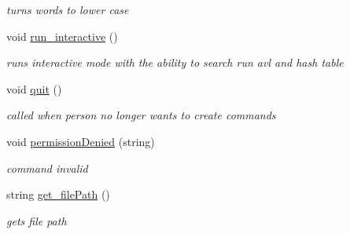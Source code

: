 \begin{DoxyCompactItemize}
\begin{DoxyCompactList}\small\item\em turns words to lower case \end{DoxyCompactList}\item 
void \hyperlink{class_interface_a48828fb2f7d1ce9cc3fe8f8bcf1a87b7}{run\+\_\+interactive} ()
\begin{DoxyCompactList}\small\item\em runs interactive mode with the ability to search run avl and hash table \end{DoxyCompactList}\item 
void \hyperlink{class_interface_a7ba995236d529ab0aee1229eb94b793d}{quit} ()
\begin{DoxyCompactList}\small\item\em called when person no longer wants to create commands \end{DoxyCompactList}\item 
void \hyperlink{class_interface_a3c7464353b37ffe8962db67c421fe30a}{permission\+Denied} (string)
\begin{DoxyCompactList}\small\item\em command invalid \end{DoxyCompactList}\item 
string \hyperlink{class_interface_a2bee39caa585218f975c1310093dd124}{get\+\_\+file\+Path} ()
\begin{DoxyCompactList}\small\item\em gets file path \end{DoxyCompactList}\end{DoxyCompactItemize}

